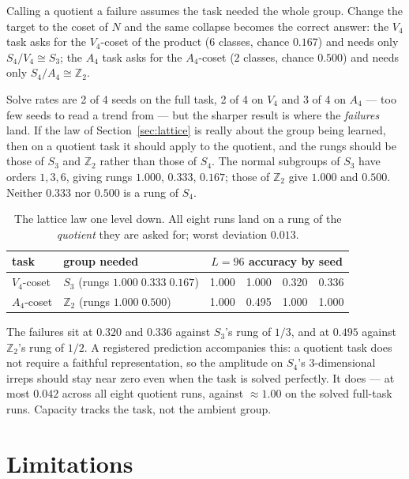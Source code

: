 \documentclass[10pt]{article}
\begin{document}
Calling a quotient a failure assumes the task needed the whole group. Change the target to the coset
of $N$ and the same collapse becomes the correct answer: the $V_4$ task asks for the $V_4$-coset of
the product ($6$ classes, chance $0.167$) and needs only $S_4/V_4\cong S_3$; the $A_4$ task asks for
the $A_4$-coset ($2$ classes, chance $0.500$) and needs only $S_4/A_4\cong\mathbb{Z}_2$.

Solve rates are 2 of 4 seeds on the full task, 2 of 4 on $V_4$ and 3 of 4 on $A_4$ --- too few seeds
to read a trend from --- but the sharper result is where the \emph{failures} land. If the law of
Section~\ref{sec:lattice} is really about the group being learned, then on a quotient task it should
apply to the quotient, and the rungs should be those of $S_3$ and $\mathbb{Z}_2$ rather than those of
$S_4$. The normal subgroups of $S_3$ have orders $1,3,6$, giving rungs $1.000$, $0.333$, $0.167$;
those of $\mathbb{Z}_2$ give $1.000$ and $0.500$. Neither $0.333$ nor $0.500$ is a rung of $S_4$.

\begin{table}[H]\centering\small
\caption{The lattice law one level down. All eight runs land on a rung of the \emph{quotient} they
are asked for; worst deviation $0.013$.}
\begin{tabular}{llcccc}
\toprule
task & group needed & \multicolumn{4}{c}{$L=96$ accuracy by seed} \\
\midrule
$V_4$-coset & $S_3$ (rungs $1.000\;0.333\;0.167$) & 1.000 & 1.000 & 0.320 & 0.336 \\
$A_4$-coset & $\mathbb{Z}_2$ (rungs $1.000\;0.500$) & 1.000 & 0.495 & 1.000 & 1.000 \\
\bottomrule
\end{tabular}
\label{tab:quotient}
\end{table}

The failures sit at $0.320$ and $0.336$ against $S_3$'s rung of $1/3$, and at $0.495$ against
$\mathbb{Z}_2$'s rung of $1/2$. A registered prediction accompanies this: a quotient task does not
require a faithful representation, so the amplitude on $S_4$'s $3$-dimensional irreps should stay near
zero even when the task is solved perfectly. It does --- at most $0.042$ across all eight quotient
runs, against $\approx1.00$ on the solved full-task runs. Capacity tracks the task, not the ambient
group.

\section{Limitations}
\end{document}
